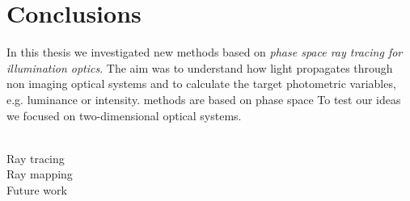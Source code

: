 \chapter{Conclusions}
In this thesis we investigated new methods based on \textit{phase space ray tracing for illumination optics}. The aim was to understand how light propagates through non imaging optical systems and to calculate the target photometric variables, e.g. luminance or intensity. methods are based on phase space 
To test our ideas we focused on two-dimensional optical systems. \\ \indent 

\\ \indent Ray tracing
\\ \indent Ray mapping
\\ \indent Future work
